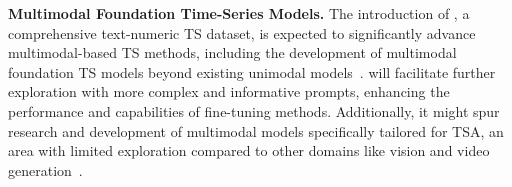 \par\noindent\textbf{Multimodal Foundation Time-Series Models.} 
The introduction of \model, a comprehensive text-numeric TS dataset, is expected to significantly advance multimodal-based TS methods, including the development of multimodal foundation TS models beyond existing unimodal models~\cite{kamarthi2023large}. \model will facilitate further exploration with more complex and informative prompts, enhancing the performance and capabilities of fine-tuning methods. Additionally, it might spur research and development of multimodal models specifically tailored for TSA, an area with limited exploration compared to other domains like vision and video generation~\cite{singh2022flava,wang2023image,xing2024make,du2024learning}.